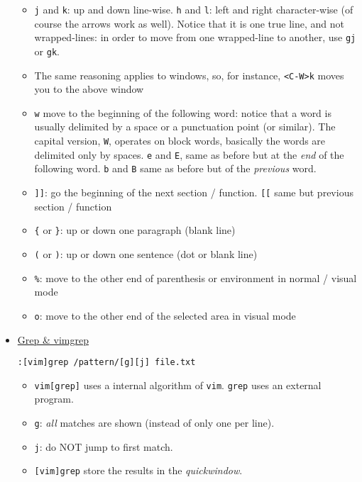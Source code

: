 \documentclass[a4paper,12pt,%
              final%
              ]{article}
\begin{document}
\begin{itemize}
    \begin{itemize}
      \item \texttt{j} and \texttt{k}: up and down line-wise. \texttt{h} and
        \texttt{l}: left and right character-wise (of course the arrows work as
        well). Notice that it is one true line, and not wrapped-lines: in order to
        move from one wrapped-line to another, use \texttt{gj} or \texttt{gk}.
      \item The same reasoning applies to windows, so, for instance, \verb|<C-W>k|
        moves you to the above window
      \item \texttt{w} move to the beginning of the following word: notice that a
        word is usually delimited by a space or a punctuation point (or similar). The
        capital version, \texttt{W}, operates on block words, basically the words are
        delimited only by spaces. \texttt{e} and \texttt{E}, same as before but at
        the \emph{end} of the following word. \texttt{b} and \texttt{B} same as
        before but of the \emph{previous} word.
      \item \texttt{]]}: go the beginning of the next section / function. \texttt{[[}
        same but previous section / function
      \item \verb|{| or \verb|}|: up or down one paragraph (blank line)
      \item \verb|(| or \verb|)|: up or down one sentence (dot or blank line)
      \item \verb|%|: move to the other end of parenthesis or environment in normal / visual mode
      \item \verb|o|: move to the other end of the selected area in visual mode
    \end{itemize}
  \item \href{https://vim.fandom.com/wiki/Find_in_files_within_Vim}{Grep \& vimgrep}
\begin{verbatim}
:[vim]grep /pattern/[g][j] file.txt
\end{verbatim}
    \begin{itemize}
      \item \texttt{vim[grep]} uses a internal algorithm of \texttt{vim}.
        \texttt{grep} uses an external program.
      \item \texttt{g}: \emph{all} matches are shown (instead of only one per line).
      \item \texttt{j}: do NOT jump to first match.
      \item \texttt{[vim]grep} store the results in the \emph{quickwindow}.

\end{itemize}
\end{itemize}
\end{document}
